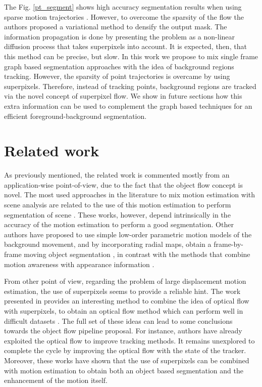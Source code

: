 The Fig. \ref{pt_segment} shows high accuracy segmentation results when using sparse motion trajectories \cite{c34}. However, to overcome 
the sparsity of the flow the authors proposed a variational method to densify the output mask. The information propagation is done 
by presenting the problem as a non-linear diffusion process that takes superpixels into account. It is expected, then, that this 
method can be precise, but slow.
In this work we propose to mix single frame graph based segmentation approaches with the idea 
of background regions tracking. However, the sparsity of point trajectories is 
overcame by using superpixels. Therefore, instead of tracking points, background regions are tracked via the novel concept of 
superpixel flow. 
We show in future sections how this extra information can be used to complement the
graph based techniques for an efficient foreground-background segmentation. 

\section{Related work}

As previously mentioned, the related work is commented mostly from an application-wise point-of-view, due to the fact that 
the object flow concept is novel. The most used approaches in the literature to mix motion estimation with scene analysis
are related to the use of this motion estimation to perform segmentation of scene \cite{c33}\cite{c34}. These works, however, depend 
intrinsically in the accuracy of the motion estimation to perform a good segmentation. Other authors have proposed to use simple 
low-order parametric motion models of the background movement, and by incorporating radial maps, obtain a frame-by-frame 
moving object segmentation \cite{c36}, in contrast with the methods that combine motion awareness with appearance information \cite{c35}. 

From other point of view, regarding the problem of large displacement motion estimation, the use of superpixels seems to provide a reliable hint. The work presented in \cite{c39} 
provides an interesting method to combine the idea of optical flow with superpixels, to obtain an optical flow method which can perform well in difficult datasets \cite{c27}. 
The full set of these ideas can lead to some conclusions towards the object flow pipeline proposal. For instance, authors have already exploited the optical flow 
to improve tracking methods. It remains unexplored to complete the cycle by improving the optical flow with the state of the tracker. Moreover, these works have shown 
that the use of superpixels can be combined with motion estimation to obtain both an object based segmentation and the enhancement of the motion itself.

